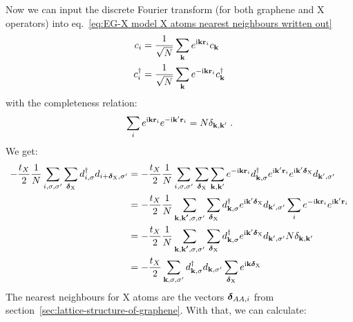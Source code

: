 Now we can input the discrete Fourier transform (for both graphene and X operators) into eq.~\ref{eq:EG-X model X atoms nearest neighbours written out}
\begin{align}
    c_{i} &= \frac{1}{\sqrt{N}} \sum_{\bm{\mathrm{k}}} e^{\mathrm{i} \bm{\mathrm{k}} \bm{\mathrm{r}}_{i}} c_{\bm{\mathrm{k}}} \\
    c_{i}^{\dagger} &= \frac{1}{\sqrt{N}} \sum_{\bm{\mathrm{k}}} e^{-\mathrm{i} \bm{\mathrm{k}} \bm{\mathrm{r}}_{i}} c_{\bm{\mathrm{k}}}^{\dagger}
\end{align}
with the completeness relation:
\begin{equation}
    \sum_{i} e^{\mathrm{i} \bm{\mathrm{k}} \bm{\mathrm{r}}_{i}} e^{-\mathrm{i} \bm{\mathrm{k}}^{\prime} \bm{\mathrm{r}}_{i}} = N \delta_{\bm{\mathrm{k}}, \bm{\mathrm{k}}^{\prime}}
    \;.
\end{equation}
We get:
\begin{align}
    -\frac{t_X}{2} \frac{1}{N} \sum_{i,\sigma, \sigma^{\prime}} \sum_{\bm{\mathrm{\delta}}_{\mathrm{X}}} d_{i, \sigma}^{\dagger} d_{i + \bm{\mathrm{\delta}}_{\mathrm{X}}, \sigma^{\prime}}
    &= -\frac{t_X}{2} \frac{1}{N} \sum_{i,\sigma, \sigma^{\prime}} \sum_{\bm{\mathrm{\delta}}_{\mathrm{X}}} \sum_{\bm{\mathrm{k}}, \bm{\mathrm{k}}^{\prime}} e^{-\mathrm{i} \bm{\mathrm{k}} \bm{\mathrm{r}}_i} d_{\bm{\mathrm{k}}, \sigma}^{\dagger} e^{\mathrm{i} \bm{\mathrm{k}}^{\prime} \bm{\mathrm{r}}_i} e^{\mathrm{i} \bm{\mathrm{k}}^{\prime} \bm{\mathrm{\delta}}_{\mathrm{X}}} d_{\bm{\mathrm{k}}^{\prime}, \sigma^{\prime}} \\
    &= -\frac{t_X}{2} \frac{1}{N} \sum_{\bm{\mathrm{k}}, \bm{\mathrm{k^{\prime}}}, \sigma, \sigma^{\prime}} \sum_{\bm{\mathrm{\delta}}_{\mathrm{X}}} d_{\bm{\mathrm{k}}, \sigma}^{\dagger}  e^{\mathrm{i} \bm{\mathrm{k}}^{\prime} \bm{\mathrm{\delta}}_{\mathrm{X}}} d_{\bm{\mathrm{k}}^{\prime}, \sigma^{\prime}} \sum_{i} e^{-\mathrm{i} \bm{\mathrm{k}} \bm{\mathrm{r}}_i} e^{\mathrm{i} \bm{\mathrm{k}}^{\prime} \bm{\mathrm{r}}_i} \\
    &= -\frac{t_X}{2} \frac{1}{N} \sum_{\bm{\mathrm{k}}, \bm{\mathrm{k^{\prime}}}, \sigma, \sigma^{\prime}} \sum_{\bm{\mathrm{\delta}}_{\mathrm{X}}} d_{\bm{\mathrm{k}}, \sigma}^{\dagger}  e^{\mathrm{i} \bm{\mathrm{k}}^{\prime} \bm{\mathrm{\delta}}_{\mathrm{X}}} d_{\bm{\mathrm{k}}^{\prime}, \sigma^{\prime}} N \delta_{\bm{\mathrm{k}}, \bm{\mathrm{k}}^{\prime}} \\
    &= -\frac{t_X}{2} \sum_{\bm{\mathrm{k}}, \sigma, \sigma^{\prime}}  d_{\bm{\mathrm{k}}, \sigma}^{\dagger}d_{\bm{\mathrm{k}}, \sigma^{\prime}} \sum_{\bm{\mathrm{\delta}}_{\mathrm{X}}} e^{\mathrm{i} \bm{\mathrm{k}} \bm{\mathrm{\delta}}_{\mathrm{X}}}
\end{align}
The nearest neighbours for \(\mathrm{X}\) atoms are the vectors \(\bm{\mathrm{\delta}}_{AA, i}\) from section~\ref{sec:lattice-structure-of-graphene}.
With that, we can calculate:

